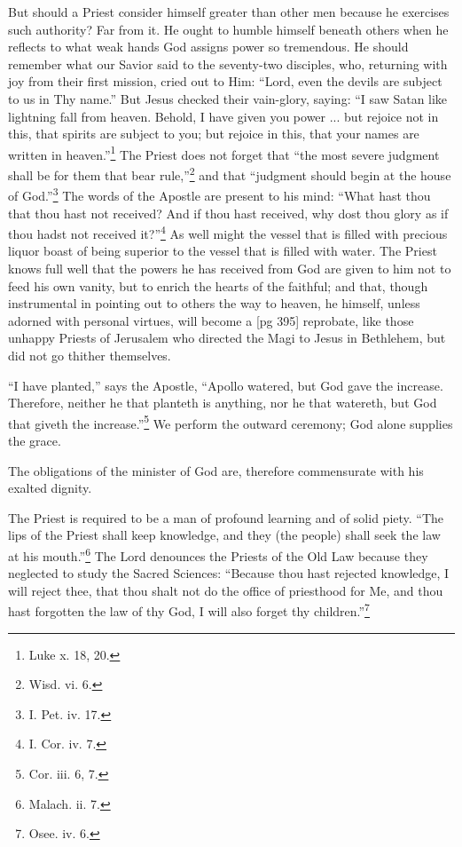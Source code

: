 But should a Priest consider himself greater
than other men because he exercises such authority?
Far from it. He ought to humble himself
beneath others when he reflects to what weak
hands God assigns power so tremendous. He
should remember what our Savior said to the seventy-two
disciples, who, returning with joy from
their first mission, cried out to Him: “Lord, even
the devils are subject to us in Thy name.” But
Jesus checked their vain-glory, saying: “I saw
Satan like lightning fall from heaven. Behold, I
have given you power ... but rejoice not in this,
that spirits are subject to you; but rejoice in this,
that your names are written in heaven.”\footnote{Luke x. 18, 20.} The
Priest does not forget that “the most severe
judgment shall be for them that bear rule,”\footnote{Wisd. vi. 6.} and
that “judgment should begin at the house of God.”\footnote{I.
Pet. iv. 17.}
The words of the Apostle are present to his mind:
“What hast thou that thou hast not received?
And if thou hast received, why dost thou glory as
if thou hadst not received it?”\footnote{I. Cor. iv. 7.} As well might
the vessel that is filled with precious liquor boast
of being superior to the vessel that is filled with
water. The Priest knows full well that the powers
he has received from God are given to him not to
feed his own vanity, but to enrich the hearts of the
faithful; and that, though instrumental in pointing
out to others the way to heaven, he himself, unless
adorned with personal virtues, will become a
[pg 395]
reprobate, like those unhappy Priests of Jerusalem
who directed the Magi to Jesus in Bethlehem,
but did not go thither themselves.

“I have planted,” says the Apostle, “Apollo
watered, but God gave the increase. Therefore,
neither he that planteth is anything, nor he that
watereth, but God that giveth the increase.”\footnote{Cor.
iii. 6, 7.} We
perform the outward ceremony; God alone supplies
the grace.

The obligations of the minister of God are, therefore
commensurate with his exalted dignity.

The Priest is required to be a man of profound
learning and of solid piety. “The lips of the
Priest shall keep knowledge, and they (the people)
shall seek the law at his mouth.”\footnote{Malach.
ii. 7.} The Lord denounces
the Priests of the Old Law because they
neglected to study the Sacred Sciences: “Because
thou hast rejected knowledge, I will reject thee,
that thou shalt not do the office of priesthood for
Me, and thou hast forgotten the law of thy God, I
will also forget thy children.”\footnote{Osee. iv. 6.}

